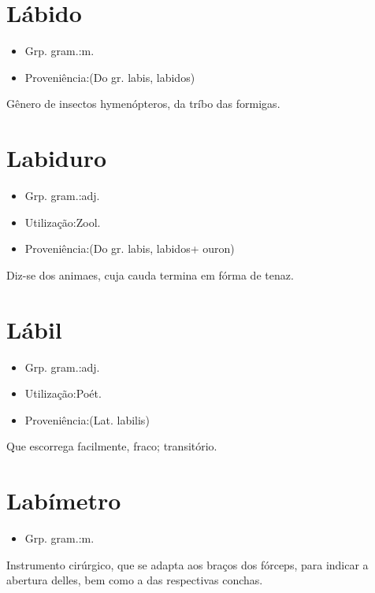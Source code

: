 \section{Lábido}
\begin{itemize}
\item {Grp. gram.:m.}
\end{itemize}
\begin{itemize}
\item {Proveniência:(Do gr. \textunderscore labis\textunderscore , \textunderscore labidos\textunderscore )}
\end{itemize}
Gênero de insectos hymenópteros, da tríbo das formigas.
\section{Labiduro}
\begin{itemize}
\item {Grp. gram.:adj.}
\end{itemize}
\begin{itemize}
\item {Utilização:Zool.}
\end{itemize}
\begin{itemize}
\item {Proveniência:(Do gr. \textunderscore labis\textunderscore , \textunderscore labidos\textunderscore  + \textunderscore ouron\textunderscore )}
\end{itemize}
Diz-se dos animaes, cuja cauda termina em fórma de tenaz.
\section{Lábil}
\begin{itemize}
\item {Grp. gram.:adj.}
\end{itemize}
\begin{itemize}
\item {Utilização:Poét.}
\end{itemize}
\begin{itemize}
\item {Proveniência:(Lat. \textunderscore labilis\textunderscore )}
\end{itemize}
Que escorrega facilmente, fraco; transitório.
\section{Labímetro}
\begin{itemize}
\item {Grp. gram.:m.}
\end{itemize}
Instrumento cirúrgico, que se adapta aos braços dos fórceps, para indicar a abertura delles, bem como a das respectivas conchas.
